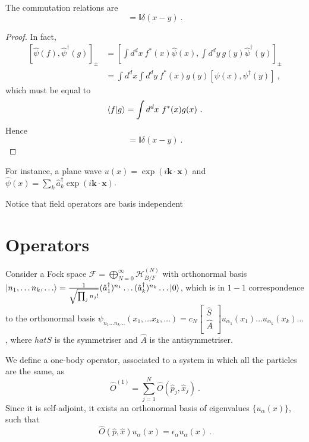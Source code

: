     The commutation relations are 
    \begin{equation*}
        [\psi(x), \psi^\dagger (y)] = \mathbb I \delta (x - y) ~.
    \end{equation*}
    \begin{proof}
        In fact,
        \begin{equation*}
        \begin{aligned}
            [\hat \psi (f), \hat \psi^\dagger (g)]_\pm & = [\int d^d x ~ f^* (x) \hat \psi(x), \int d^d y ~ g(y) \hat \psi^\dagger (y)]_\pm \\ & = \int d^d x \int d^d y ~ f^*(x) g(y) [\psi(x), \psi^\dagger (y)]  ~,
        \end{aligned}
        \end{equation*}
        which must be equal to 
        \begin{equation*}
            \langle f\vert g\rangle = \int d^d x ~ f^* (x) g(x) ~.
        \end{equation*}
        Hence 
        \begin{equation*}
            [\psi(x), \psi^\dagger (y)] = \mathbb I \delta (x - y) ~.
        \end{equation*}
    \end{proof}

    For instance, a plane wave $u(x) = \exp (i \mathbf k \cdot \mathbf x) $ and $\hat \psi(x) = \sum_k \hat a_k^\dagger \exp(i \mathbf k \cdot \mathbf x)$.

    Notice that field operators are basis independent

\section{Operators}

    Consider a Fock space $\mathcal F = \bigoplus_{N=0}^\infty \mathcal H^{(N)}_{B/F}$ with orthonormal basis $\vert n_1, \ldots n_k, \ldots\rangle = \frac{1}{\sqrt{\prod_j n_j !}} (\hat a^\dagger_1)^{n_1} \ldots (\hat a_k^\dagger)^{n_k} \ldots \vert0\rangle$, which is in $1-1$ correspondence to the orthonormal basis $\psi_{n_1 \ldots n_k \ldots} (x_1, \ldots x_k, \ldots) = c_N \begin{bmatrix} \hat S \\ \hat A \\ \end{bmatrix} u_{\alpha_1} (x_1) \ldots u_{\alpha_k} (x_k) \ldots$, where $hat S$ is the symmetriser and $\hat A$ is the antisymmetriser.

    We define a one-body operator, associated to a system in which all the particles are the same, as 
    \begin{equation*}
        \hat O^{(1)} = \sum_{j=1}^{N} \hat O(\hat p_j, \hat x_j) ~.
    \end{equation*}
    Since it is self-adjoint, it exists an orthonormal basis of eigenvalues $\{u_\alpha (x)\}$, such that 
    \begin{equation*}
        \hat O(\hat p, \hat x) u_\alpha (x) = \epsilon_\alpha u_\alpha (x) ~.
    \end{equation*}

